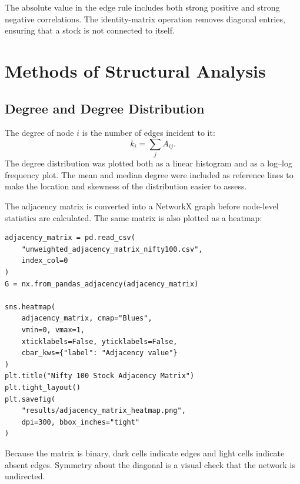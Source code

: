 \documentclass[12pt]{article}
\numberwithin{equation}{section}
\begin{document}
The absolute value in the edge rule includes both strong positive and strong
negative correlations. The identity-matrix operation removes diagonal
entries, ensuring that a stock is not connected to itself.

\section{Methods of Structural Analysis}
\subsection{Degree and Degree Distribution}
The degree of node $i$ is the number of edges incident to it:
\begin{equation}
  k_i=\sum_j A_{ij}.
\end{equation}
The degree distribution was plotted both as a linear histogram and as a
log--log frequency plot. The mean and median degree were included as reference
lines to make the location and skewness of the distribution easier to assess.

The adjacency matrix is converted into a NetworkX graph before node-level
statistics are calculated. The same matrix is also plotted as a heatmap:

\begin{lstlisting}[caption={Loading the graph and saving the adjacency heatmap.}]
adjacency_matrix = pd.read_csv(
    "unweighted_adjacency_matrix_nifty100.csv",
    index_col=0
)
G = nx.from_pandas_adjacency(adjacency_matrix)

sns.heatmap(
    adjacency_matrix, cmap="Blues",
    vmin=0, vmax=1,
    xticklabels=False, yticklabels=False,
    cbar_kws={"label": "Adjacency value"}
)
plt.title("Nifty 100 Stock Adjacency Matrix")
plt.tight_layout()
plt.savefig(
    "results/adjacency_matrix_heatmap.png",
    dpi=300, bbox_inches="tight"
)
\end{lstlisting}

Because the matrix is binary, dark cells indicate edges and light cells
indicate absent edges. Symmetry about the diagonal is a visual check that the
network is undirected.
\end{document}
